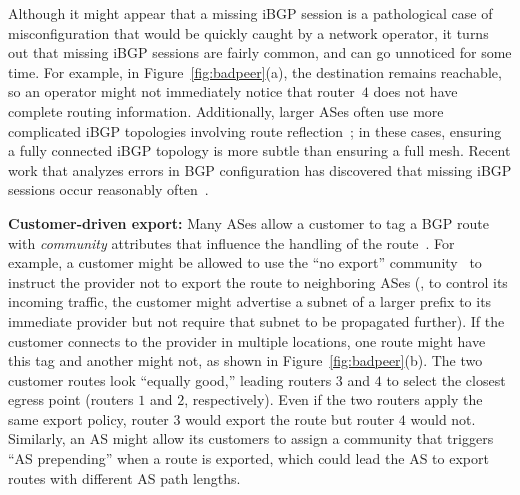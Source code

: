 Although it might appear that a missing iBGP session is a pathological
case of misconfiguration that would be quickly caught by a network
operator, it turns out that missing iBGP sessions are fairly common, and
can go unnoticed for some time. For example, in
Figure~\ref{fig:badpeer}(a), the destination remains reachable,
so an operator might not immediately notice that router~$4$
does not have complete routing information.  Additionally, larger ASes
often use more complicated iBGP topologies involving route
reflection~\cite{rfc2796}; in these cases, ensuring a fully connected
iBGP topology is more subtle than ensuring a full mesh.  Recent work
that analyzes errors in BGP configuration has discovered that missing
iBGP sessions occur reasonably often~\cite{Feamster2004h}.

\noindent
{\bf Customer-driven export:} Many ASes allow a customer to tag a BGP
route with {\em community\/} attributes that influence the handling of
the route~\cite{rfc1997,rfc1998}.  For example, a customer might be
allowed to use the ``no export'' community~\cite{rfc1997} to instruct
the provider not to export the route to neighboring ASes (\eg, to
control its incoming traffic, the
customer might advertise a subnet of a larger prefix to its immediate
provider but not require that subnet to be propagated further). 
If the customer connects to the provider in multiple locations, one
route might have this tag and another might not, as shown in
Figure~\ref{fig:badpeer}(b).  The two customer routes look ``equally
good,'' leading routers $3$ and $4$ to select the closest egress point
(routers $1$ and $2$, respectively).  Even if the two routers apply
the same export policy, router $3$ would export the route but router
$4$ would not.  Similarly, an AS might allow its customers to assign
a community that triggers ``AS prepending'' when a route is exported,
which could lead the AS to export routes with different AS path lengths.


